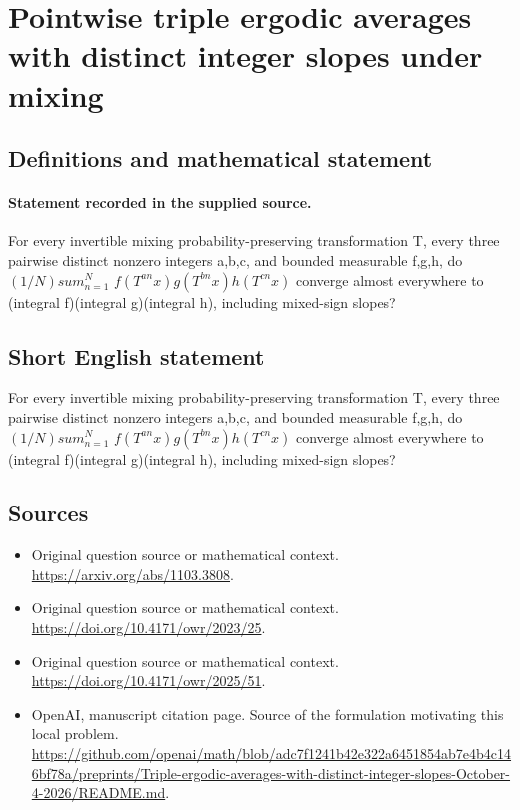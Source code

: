 \documentclass[11pt]{article}
\begin{document}
\section*{Pointwise triple ergodic averages with distinct integer slopes under mixing}\label{statement}
\subsection{Definitions and mathematical statement}
\paragraph{Statement recorded in the supplied source.}
For every invertible mixing probability-preserving transformation T, every three pairwise distinct nonzero integers a,b,c, and bounded measurable f,g,h, do $(1/N)sum_{n=1}^N$ $f(T^{an}x)g(T^{bn}x)h(T^{cn}x)$ converge almost everywhere to (integral f)(integral g)(integral h), including mixed-sign slopes?
\subsection{Short English statement}
For every invertible mixing probability-preserving transformation T, every three pairwise distinct nonzero integers a,b,c, and bounded measurable f,g,h, do $(1/N)sum_{n=1}^N$ $f(T^{an}x)g(T^{bn}x)h(T^{cn}x)$ converge almost everywhere to (integral f)(integral g)(integral h), including mixed-sign slopes?
\subsection{Sources}
\begin{itemize}
\item[S1] Original question source or mathematical context.
\url{https://arxiv.org/abs/1103.3808}.
\item[S2] Original question source or mathematical context.
\url{https://doi.org/10.4171/owr/2023/25}.
\item[S3] Original question source or mathematical context.
\url{https://doi.org/10.4171/owr/2025/51}.
\item[S4] OpenAI, manuscript citation page. Source of the formulation motivating this local problem.
\url{https://github.com/openai/math/blob/adc7f1241b42e322a6451854ab7e4b4c146bf78a/preprints/Triple-ergodic-averages-with-distinct-integer-slopes-October-4-2026/README.md}.
\end{itemize}
\end{document}
